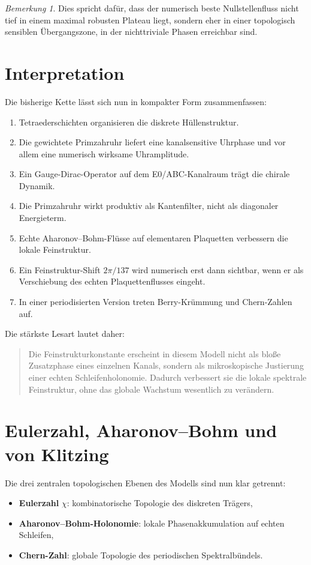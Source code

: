 \documentclass[11pt,a4paper]{article}
\theoremstyle{remark}
\newtheorem{bemerkung}[definition]{Bemerkung}
\begin{document}
	\begin{bemerkung}
		Dies spricht dafür, dass der numerisch beste Nullstellenfluss nicht tief in einem maximal robusten Plateau liegt, sondern eher in einer topologisch sensiblen Übergangszone, in der nichttriviale Phasen erreichbar sind.
	\end{bemerkung}
	
	\section{Interpretation}
	
	Die bisherige Kette lässt sich nun in kompakter Form zusammenfassen:
	\begin{enumerate}[label=(\arabic*)]
		\item Tetraederschichten organisieren die diskrete Hüllenstruktur.
		\item Die gewichtete Primzahruhr liefert eine kanalsensitive Uhrphase und vor allem eine numerisch wirksame Uhramplitude.
		\item Ein Gauge-Dirac-Operator auf dem E0/ABC-Kanalraum trägt die chirale Dynamik.
		\item Die Primzahruhr wirkt produktiv als Kantenfilter, nicht als diagonaler Energieterm.
		\item Echte Aharonov--Bohm-Flüsse auf elementaren Plaquetten verbessern die lokale Feinstruktur.
		\item Ein Feinstruktur-Shift $2\pi/137$ wird numerisch erst dann sichtbar, wenn er als Verschiebung des echten Plaquettenflusses eingeht.
		\item In einer periodisierten Version treten Berry-Krümmung und Chern-Zahlen auf.
	\end{enumerate}
	
	Die stärkste Lesart lautet daher:
	\begin{quote}
		Die Feinstrukturkonstante erscheint in diesem Modell nicht als bloße Zusatzphase eines einzelnen Kanals, sondern als mikroskopische Justierung einer echten Schleifenholonomie. Dadurch verbessert sie die lokale spektrale Feinstruktur, ohne das globale Wachstum wesentlich zu verändern.
	\end{quote}
	
	\section{Eulerzahl, Aharonov--Bohm und von Klitzing}
	
	Die drei zentralen topologischen Ebenen des Modells sind nun klar getrennt:
	\begin{itemize}
		\item \textbf{Eulerzahl} $\chi$: kombinatorische Topologie des diskreten Trägers,
		\item \textbf{Aharonov--Bohm-Holonomie}: lokale Phasenakkumulation auf echten Schleifen,
		\item \textbf{Chern-Zahl}: globale Topologie des periodischen Spektralbündels.
	\end{itemize}
	
\end{document}
